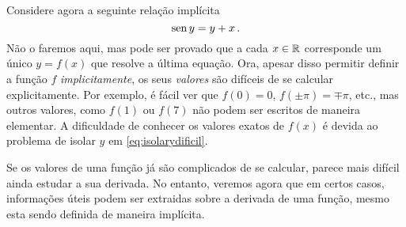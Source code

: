 \begin{ex}
Considere agora a seguinte relação implícita
\begin{equation}\label{eq:isolarydificil}
\operatorname{sen} y=y+x\,.
\end{equation}
Não o faremos aqui, mas pode ser provado que a cada $x\in \mathbb{R}$
corresponde um único $y=f(x)$ que resolve a última equação. 
Ora, apesar disso permitir {definir} a função $f$
\emph{implicitamente}, 
os seus \emph{valores} são difíceis de se
calcular explicitamente.
Por exemplo, é fácil ver que $f(0)=0$, $f(\pm \pi)=\mp\pi$,
etc., mas outros valores, como $f(1)$ ou $f(7)$ não podem ser escritos de
maneira elementar. 
A dificuldade de conhecer os valores exatos de $f(x)$ é devida
ao problema de isolar $y$ em \eqref{eq:isolarydificil}.
\end{ex}

Se os valores de uma função já são complicados de se calcular,
parece mais difícil ainda estudar a sua derivada.
No entanto, veremos agora que em certos casos, informações úteis
podem ser extraidas sobre a derivada de uma função, mesmo esta
sendo definida de maneira implícita.

